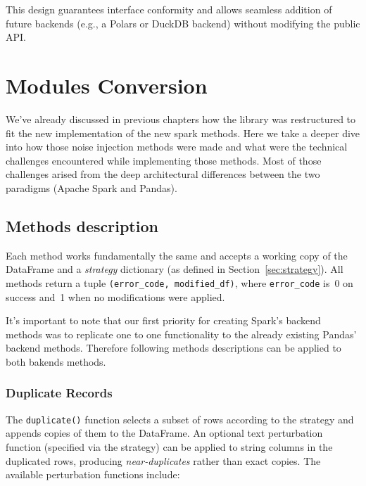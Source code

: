 \documentclass[../main.tex]{subfiles}
\begin{document}
This design guarantees interface conformity and allows seamless addition
of future backends (e.g., a Polars or DuckDB backend) without modifying
the public API.




\newpage
\section{Modules Conversion}
\label{sec:Modules_conversion}

We've already discussed in previous chapters how the library was restructured to fit the new implementation of the new spark methods. Here we take a deeper dive into how those noise injection methods were made and what were the technical challenges encountered while implementing those methods. Most of those challenges arised from the deep architectural differences between the two paradigms (Apache Spark and Pandas). 

\subsection{Methods description}
\label{sec:method_description}


Each method works fundamentally the same and accepts a working copy of the DataFrame and a \emph{strategy} dictionary (as defined in Section~\ref{sec:strategy}). All methods return a tuple \texttt{(error\_code, modified\_df)}, where \texttt{error\_code} is~0 on success and~1 when no modifications were applied. 

It's important to note that our first priority for creating Spark's backend methods was to replicate one to one functionality to the already existing Pandas' backend methods. Therefore following methods descriptions can be applied to both bakends methods.

\subsubsection{Duplicate Records}\label{sec:duplicated}

The \texttt{duplicate()} function selects a subset of rows according to
the strategy and appends copies of them to the DataFrame.  An optional
text perturbation function (specified via the strategy) can be applied to
string columns in the duplicated rows, producing \emph{near-duplicates}
rather than exact copies. The available perturbation functions include:
\end{document}
